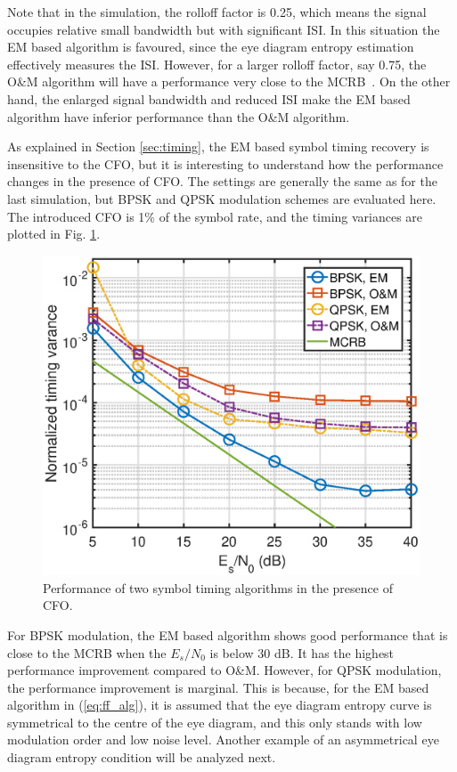 \documentclass[journal,comsoc, onecolumn, 12pt,draftclsnofoot]{IEEEtran} %
\begin{document}
Note that in the simulation, the rolloff factor is 0.25, which means the signal occupies relative small bandwidth but with significant ISI.
In this situation the EM based algorithm is favoured, since the eye diagram entropy estimation effectively measures the ISI.
However, for a larger rolloff factor, say 0.75, the O\&M algorithm will have a performance very close to the MCRB~\cite{mengali1997synchronization}.
% 
% 
On the other hand, the enlarged signal bandwidth and reduced ISI make the EM based algorithm have inferior performance than the O\&M algorithm.

As explained in Section \ref{sec:timing}, the EM based symbol timing recovery is insensitive to the CFO, but it is interesting to understand how the performance changes in the presence of CFO. 
The settings are generally the same as for the last simulation, but BPSK and QPSK modulation schemes are evaluated here.
The introduced CFO is 1\% of the symbol rate, and the timing variances are plotted in Fig. \ref{fig:timing_frq_per}.

\begin{figure}[ht]
\centering
\includegraphics[width=3 in]{pic/per_timing_frq.eps}
\caption{Performance of two symbol timing algorithms in the presence of CFO.}
\label{fig:timing_frq_per} 
\end{figure}  

For BPSK modulation, the EM based algorithm shows good performance that is close to the MCRB when the \(E_s/N_0\) is below 30 dB.
It has the highest performance improvement compared to O\&M.
However, for QPSK modulation, the performance improvement is marginal.
This is because, for the EM based algorithm in (\ref{eq:ff_alg}), it is assumed that the eye diagram entropy curve is symmetrical to the centre of the eye diagram, and this only stands with low modulation order and low noise level.
Another example of an asymmetrical eye diagram entropy condition will be analyzed next. 
\end{document}
